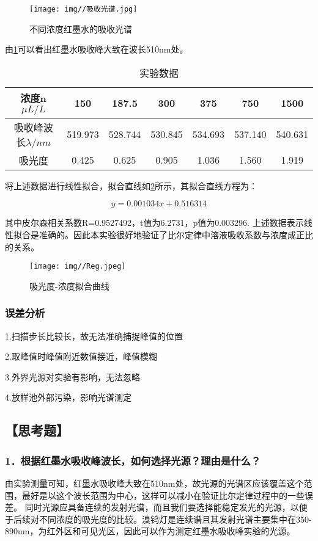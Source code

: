\documentclass[12pt,a4paper,UTF8]{ctexart}
\begin{document}
\begin{figure}[htbp]
	\centering
	\texttt{[image: img//吸收光谱.jpg]}
	\caption{不同浓度红墨水的吸收光谱}
	\label{fig:1}
\end{figure}

由\ref{fig:1}可以看出红墨水吸收峰大致在波长510nm处。


\begin{table}[htbp]
	\caption{实验数据}
	\centering
    \begin{tabular}{|c|c|c|c|c|c|c|}
	\hline
    浓度n $\mu L/L $   & 150 & 187.5 & 300 & 375 & 750 & 1500 \\
	\hline
    吸收峰波长$\lambda /nm$ & 519.973 & 528.744 & 530.845 & 534.693 & 537.140 & 540.631 \\
	\hline
    吸光度 & 0.425 & 0.625 & 0.905 & 1.036 & 1.560 & 1.919 \\
	\hline
	\end{tabular}%
	\label{tab:data}%
\end{table}%
将上述数据进行线性拟合，拟合直线如\ref{fig:2}所示，其拟合直线方程为：

\begin{equation*}
	y=0.001034x+0.516314
\end{equation*}

其中皮尔森相关系数R=0.9527492，t值为6.2731，p值为0.003296.
上述数据表示线性拟合是准确的。因此本实验很好地验证了比尔定律中溶液吸收系数与浓度成正比的关系。


\begin{figure}[htbp]
	\centering
	\texttt{[image: img//Reg.jpeg]}
	\caption{吸光度-浓度拟合曲线}
	\label{fig:2}
\end{figure}

\newpage
\subsubsection*{误差分析}
1.扫描步长比较长，故无法准确捕捉峰值的位置

2.取峰值时峰值附近数值接近，峰值模糊

3.外界光源对实验有影响，无法忽略

4.放样池外部污染，影响光谱测定

\subsection*{【思考题】}
\subsubsection*{1．根据红墨水吸收峰波长，如何选择光源？理由是什么？}
由实验测量可知，红墨水吸收峰大致在510nm处，故光源的光谱区应该覆盖这个范围，最好是以这个波长范围为中心，这样可以减小在验证比尔定律过程中的一些误差。
同时光源应具备连续的发射光谱，而且我们要选择能稳定发光的光源，以便于后续对不同浓度的吸光度的比较。溴钨灯是连续谱且其发射光谱主要集中在350-890nm，为红外区和可见光区，因此可以作为测定红墨水吸收峰实验的光源。
\end{document}
